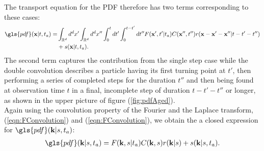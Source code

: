 The transport equation for the \gls{PDF} therefore has two terms corresponding to these cases:
%
\begin{align}
\gls{pdf}(\ve{x}|t,t_a) = &\int_{\mathbb{R}^d} d^{d}x' \int_{\mathbb{R}^d} d^{d}x'' \int_{0}^{t} dt' \int_{0}^{t-t'} d t''   F(\ve{x}',t'|t_a)  C(\ve{x}'',t'') r(\ve{x}-\ve{x}'-\ve{x}''| t-t'-t'') \nonumber \\
&+ s(\ve{x}|t,t_a).
\end{align}
%
The second term captures the contribution from the single step case while the double convolution describes a particle having its first turning point at $t'$, then performing a series of completed steps for the duration $t''$ and then being found at observation time $t$ in a final, incomplete step of duration $t-t'-t''$ or longer, as shown in the upper picture of figure (\ref{fig:pdfAged}).\\
Again using the convolution property of the Fourier and the Laplace transform,  (\ref{eqn:FConvolution}) and (\ref{eqn:FConvolution}), we obtain the a closed expression for $\gls{pdf}(\ve{k}|s,t_a)$:
%
\begin{align}
\gls{pdf}(\ve{k}|s,t_a) =  F(\ve{k},s|t_a)  C(\ve{k},s) r(\ve{k}|s) + s(\ve{k}|s,t_a).
\end{align}
